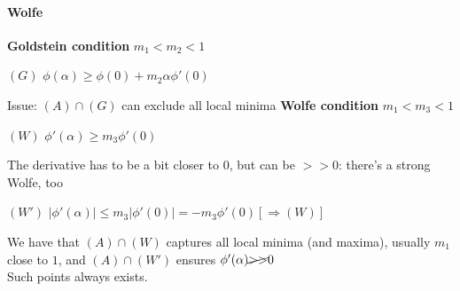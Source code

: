 \documentclass[10pt]{report}
\begin{document}
\paragraph{Wolfe} \textbf{Goldstein condition} $m_1 < m_2 < 1$
\begin{list}{}{}
	\item[$(G)$] $\phi(\alpha)\geq \phi(0) + m_2\alpha\phi'(0)$
\end{list}
Issue: $(A)\cap (G)$ can exclude all local minima
\textbf{Wolfe condition} $m_1 < m_3 < 1$
\begin{list}{}{}
	\item[$(W)$] $\phi'(\alpha)\geq m_3\phi'(0)$
\end{list}
The derivative has to be a bit closer to $0$, but can be $>>0$: there's a strong Wolfe, too
\begin{list}{}{}
	\item[$(W')$] $|\phi'(\alpha)|\leq m_3|\phi'(0)| = -m_3\phi'(0) [\Rightarrow (W)]$
\end{list}
We have that $(A)\cap (W)$ captures all local minima (and maxima), usually $m_1$ close to $1$, and $(A)\cap(W')$ ensures $\phi'(\alpha) \cancel{>>}0$\\
Such points always exists.
\end{document}
